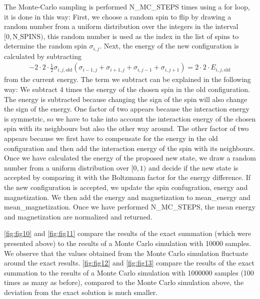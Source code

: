 \documentclass[a4paper,10pt,bibtotoc]{scrartcl}
\begin{document}
The Monte-Carlo sampling is performed N\_MC\_STEPS times using a for loop, it is done in this way: 
First, we choose a random spin to flip by drawing a random number from a uniform distribution over the integers in the interval $[0,\mathrm{N\_SPINS})$, this random number is used as the index in the list of spins to determine the random spin $\sigma_{i,j}$.
Next, the energy of the new configuration is calculated by subtracting
\begin{align}
-2\cdot 2\cdot \frac{1}{2}\sigma_{i,j,\mathrm{old}}\left(\sigma_{i-1, j}+\sigma_{i+1, j}+\sigma_{i, j-1}+\sigma_{i, j+1}\right) = 2\cdot 2\cdot E_{i,j,\mathrm{old}}
\end{align}
from the current energy.
The term we subtract can be explained in the following way: 
We subtract 4 times the energy of the chosen spin in the old configuration. 
The energy is subtracted because changing the sign of the spin will also change the sign of the energy. 
One factor of two appears because the interaction energy is symmetric, so we have to take into account the interaction energy of the chosen spin with its neighbours but also the other way around. 
The other factor of two appears because we first have to compensate for the energy in the old configuration and then add the interaction energy of the spin with its neighbours.
Once we have calculated the energy of the proposed new state, we draw a random number from a uniform distribution over $[0,1)$ and decide if the new state is accepted by comparing it with the Boltzmann factor for the energy difference.
If the new configuration is accepted, we update the spin confugration, energy and magnetization.
We then add the energy and magnetization to mean\_energy and mean\_magnetization.
Once we have performed N\_MC\_STEPS, the mean energy and magnetization are normalized and returned.

\autoref{fig:fig10} and \autoref{fig:fig11} compare the results of the exact summation (which were presented above) to the results of a Monte Carlo simulation with 10000 samples. 
We observe that the values obtained from the Monte Carlo simulation fluctuate around the exact results.
\autoref{fig:fig12} and \autoref{fig:fig13} compare the results of the exact summation to the results of a Monte Carlo simulation with 1000000 samples (100 times as many as before), compared to the Monte Carlo simulation above, the deviation from the exact solution is much smaller. 
\end{document}
